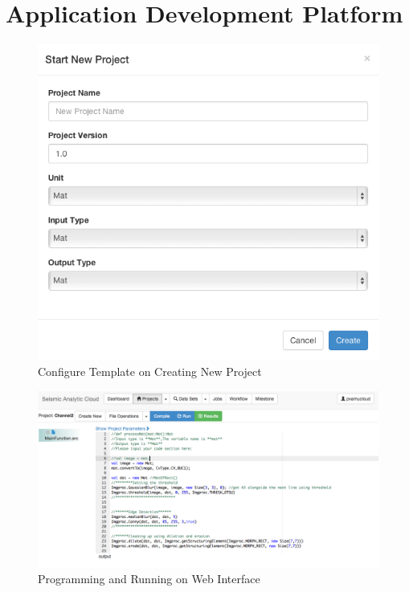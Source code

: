 \section{Application Development Platform}


\begin{figure}[H]
\centering
\includegraphics[scale=.60]{figures/NewProject.png}
\caption{Configure Template on Creating New Project}
\label{NewProject}
\end{figure}

\begin{figure}[H]
\centering
\includegraphics[scale=.35]{figures/Programming.png}
\caption{Programming and Running on Web Interface}
\label{Template}
\end{figure}



